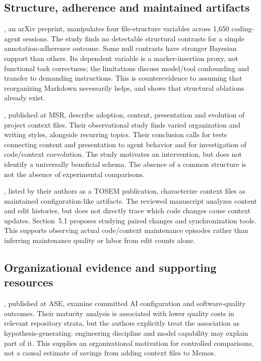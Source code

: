 \subsection{Structure, adherence and maintained artifacts}
\citet{mcmillan2026}, an arXiv preprint, manipulates four file-structure variables
across 1,650 coding-agent sessions. The study finds no detectable structural contrasts
for a simple annotation-adherence outcome. Some null contrasts have stronger
Bayesian support than others. Its dependent variable is a marker-insertion
proxy, not functional task correctness; the limitations discuss model/tool
confounding and transfer to demanding instructions. This is counterevidence
to assuming that reorganizing Markdown necessarily helps, and shows that
structural ablations already exist.

\citet{mohsenimofidi2026}, published at MSR, describe adoption, content,
presentation and evolution of project context files. Their observational study
finds varied organization and writing styles, alongside recurring topics.
Their conclusion calls for tests connecting content and presentation to agent
behavior and for investigation of code/context coevolution. The study motivates
an intervention, but does not identify a universally beneficial schema. The
absence of a common structure is not the absence of experimental comparisons.

\citet{chatlatanagulchai2026}, listed by their authors as a TOSEM publication,
characterize context files as maintained configuration-like artifacts. The
reviewed manuscript analyzes content and edit histories, but does not directly
trace which code changes cause context updates. Section~5.1 proposes studying
paired changes and synchronization tools. This supports observing actual
code/context maintenance episodes rather than inferring maintenance quality
or labor from edit counts alone.

\subsection{Organizational evidence and supporting resources}
\citet{denisov2026}, published at ASE, examine committed AI configuration and
software-quality outcomes. Their maturity analysis is associated with lower
quality costs in relevant repository strata, but the authors explicitly treat
the association as hypothesis-generating: engineering discipline and model
capability may explain part of it. This supplies an organizational motivation
for controlled comparisons, not a causal estimate of savings from adding
context files to Memos.

